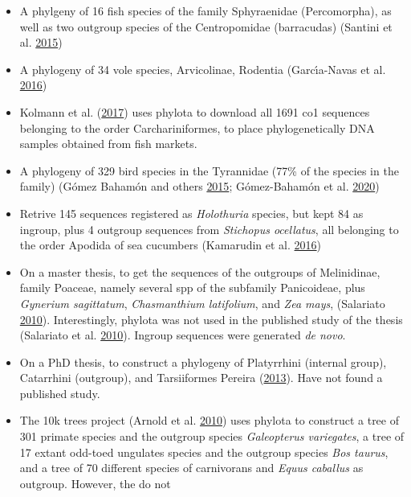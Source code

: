 \documentclass[]{article}
\begin{document}
\begin{enumerate}
\begin{itemize}
  \item
    A phylgeny of 16 fish species of the family Sphyraenidae (Percomorpha), as well
    as two outgroup species of the Centropomidae (barracudas) (Santini et al. \protect\hyperlink{ref-santini2015first}{2015})
  \item
    A phylogeny of 34 vole species, Arvicolinae, Rodentia (Garcı́a-Navas et al. \protect\hyperlink{ref-garcia2016role}{2016})
  \item
    Kolmann et al. (\protect\hyperlink{ref-kolmann2017dna}{2017}) uses phylota to download all 1691 co1 sequences belonging to
    the order Carchariniformes, to place phylogenetically DNA samples obtained from
    fish markets.
  \item
    A phylogeny of 329 bird species in the Tyrannidae (77\% of the species in the
    family) (Gómez Bahamón and others \protect\hyperlink{ref-gomez2015behavioral}{2015}; Gómez-Bahamón et al. \protect\hyperlink{ref-gomez2020speciation}{2020})
  \item
    Retrive 145 sequences registered as \emph{Holothuria} species, but kept 84 as ingroup,
    plus 4 outgroup sequences from \emph{Stichopus ocellatus}, all belonging to the order
    Apodida of sea cucumbers (Kamarudin et al. \protect\hyperlink{ref-kamarudin2016phylogenetic}{2016})
  \item
    On a master thesis, to get the sequences of the outgroups of Melinidinae, family Poaceae, namely several spp of the
    subfamily Panicoideae, plus \emph{Gynerium sagittatum}, \emph{Chasmanthium latifolium},
    and \emph{Zea mays}, (Salariato \protect\hyperlink{ref-salariato2010filogenia}{2010}). Interestingly, phylota was not used
    in the published study of the thesis (Salariato et al. \protect\hyperlink{ref-salariato2010molecular}{2010}). Ingroup sequences were generated \emph{de novo}.
  \item
    On a PhD thesis, to construct a phylogeny of Platyrrhini (internal group),
    Catarrhini (outgroup), and Tarsiiformes Pereira (\protect\hyperlink{ref-pereira2013padroes}{2013}). Have not found a published study.
  \item
    The 10k trees project (Arnold et al. \protect\hyperlink{ref-arnold201010ktrees}{2010}) uses phylota to construct a tree of 301 primate species
    and the outgroup species \emph{Galeopterus variegates}, a tree of 17 extant odd-toed
    ungulates species and the outgroup species \emph{Bos taurus}, and a tree of 70 different
    species of carnivorans and \emph{Equus caballus} as outgroup. However, the do not

\end{itemize}
\end{enumerate}
\end{document}
